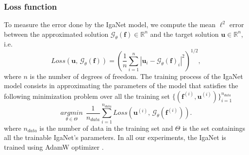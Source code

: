 \documentclass{article}
\newcommand{\R}{\mathbb{R}}
\theoremstyle{plain}
\numberwithin{equation}{section}
\begin{document}
\subsubsection{Loss function}
To measure the error done by the IgaNet model, we compute the mean $\ell^2$ error between the approximated solution $\mathcal{G}_\theta(\mathbf{f})\in \R^n$ and the target solution $\mathbf{u}\in \R^n$, i.e.
\begin{equation}
    Loss\left(\mathbf{u},\, \mathcal{G}_\theta(\mathbf{f})\right)
    = \left(\frac{1}{n}\sum_{i=1}^{n} |\mathbf{u}_i - \mathcal{G}_\theta(\mathbf{f})_i|^2\right)^{1/2},
    \label{eq:l2_error}
\end{equation}
where $n$ is the number of degrees of freedom. The training process of the IgaNet model consists in approximating the parameters of the model that satisfies the following minimization problem over all the training set $\{(\mathbf{f}^{(i)}, \mathbf{u}^{(i)})\}_{i=1}^{n_{data}}$
\[
    \underset{\theta\in\Theta}{argmin} \ \ \frac{1}{n_{data}} \sum_{i=1}^{n_{data}} Loss\left(\mathbf{u}^{(i)},\, \mathcal{G}_\theta(\mathbf{f}^{(i)})\right).
\]
where $n_{data}$ is the number of data in the training set and $\Theta$ is the set containings all the trainable IgaNet's parameters.
In all our experiments, the IgaNet is trained using AdamW optimizer \cite{loshchilov2019decoupledweightdecayregularization}.
\end{document}
